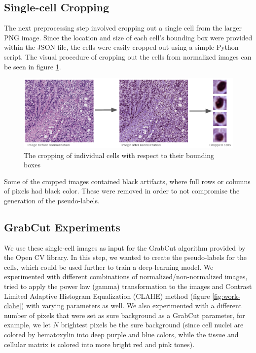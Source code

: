\subsection{Single-cell Cropping}
The next preprocessing step involved cropping out a single cell from the larger PNG image. Since the location and size of each cell's bounding box were provided within the JSON file, the cells were easily cropped out using a simple Python script. The visual procedure of cropping out the cells from normalized images can be seen in figure \ref{fig:work-cell-crop}.

\begin{figure}[H]
    \begin{centering}
    \includegraphics[width=14cm]{assets/images/work-cell-cropping.png}
    \par\end{centering}
    \caption{The cropping of individual cells with respect to their bounding boxes}
    \label{fig:work-cell-crop}
\end{figure}

Some of the cropped images contained black artifacts, where full rows or columns of pixels had black color. These were removed in order to not compromise the generation of the pseudo-labels.

\subsection{GrabCut Experiments}
We use these single-cell images as input for the GrabCut algorithm provided by the Open CV library. In this step, we wanted to create the pseudo-labels for the cells, which could be used further to train a deep-learning model. We experimented with different combinations of normalized/non-normalized images, tried to apply the power law (gamma) transformation to the images and Contrast Limited Adaptive Histogram Equalization (CLAHE) method (figure \ref{fig:work-clahe}) with varying parameters as well. We also experimented with a different number of pixels that were set as sure background as a GrabCut parameter, for example, we let $N$ brightest pixels be the sure background (since cell nuclei are colored by hematoxylin into deep purple and blue colors, while the tissue and cellular matrix is colored into more bright red and pink tones). 

